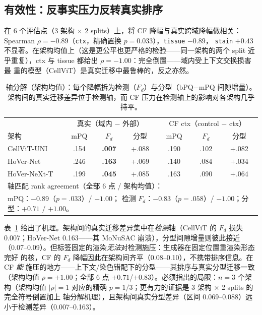 \documentclass[11pt]{article}
\begin{document}
\subsection{有效性：反事实压力反转真实排序}
\label{sec:validity}

在 6 个评估点（3 架构 $\times$ 2 splits）上，将 CF 降幅与真实跨域降幅做相关：Spearman
$\rho=-0.89$（\texttt{ctx}，精确置换 $p=0.033$），\texttt{tissue} $-0.89$，
\texttt{stain} $+0.43$ 不显著。在架构均值上（这是更公平也更严格的检验——同一架构的两个
split 近乎重复），ctx 与 tissue 都给出 $\rho=-1.00$：完全倒置——域内受上下文交换损害最
重的模型（CellViT）是真实迁移中最鲁棒的，反之亦然。

\begin{table}[t]
\centering\small
\caption{轴分解（架构均值）：每个降幅拆为检测（$F_d$）与分型（bPQ$-$mPQ 间隙增量）。
架构间的真实迁移差异位于检测轴，而 CF 压力在检测轴上的影响对各架构几乎持平。}
\label{tab:axes}
\begin{tabular}{lcc|cc|cc}
\toprule
& \multicolumn{3}{c|}{真实（域内 $-$ 外部）} & \multicolumn{3}{c}{CF ctx（control $-$ ctx）} \\
架构 & mPQ & $F_d$ & 分型 & mPQ & $F_d$ & 分型 \\
\midrule
CellViT-UNI  & .154 & \textbf{.007} & +.088 & .190 & .102 & +.082 \\
HoVer-Net    & .246 & \textbf{.163} & +.069 & .140 & .084 & +.034 \\
HoVer-NeXt-T & .199 & \textbf{.045} & +.085 & .163 & .090 & +.064 \\
\midrule
\multicolumn{7}{l}{\footnotesize 轴匹配 rank agreement（全部 6 点 / 架构均值）：}\\
\multicolumn{7}{l}{\footnotesize\quad mPQ：$-0.89$（$p{=}.033$）/ $-1.00$；\quad
检测 $F_d$：$-0.83$（$p{=}.058$）/ $-1.00$；\quad 分型：$+0.71$ / $\mathbf{+1.00}$。}\\
\bottomrule
\end{tabular}
\end{table}

表~\ref{tab:axes} 给出了机理。架构间的真实迁移差异集中在\emph{检测}轴（CellViT 的
$F_d$ 损失 0.007；HoVer-Net 0.163——其 MoNuSAC 崩溃），分型间隙增量则彼此接近
（0.07--0.09）。但标签固定的渲染\emph{无法}对检测施压：生成器在固定位置重渲染形态完好
的核，CF 的 $F_d$ 降幅因此在架构间齐平（0.08--0.10），不携带排序信息。在 CF \emph{能}
施压的地方——上下文/染色错配下的分型——其排序与真实分型迁移一致（架构均值
$\rho=+1.00$；全部 6 点 $+0.71$/$+0.83$）。必须指出的局限：$n=3$ 个架构（架构均值
$|\rho|=1$ 对应的精确 $p=1/3$；更有力的证据是 3 架构 $\times$ 2 splits 的完全符号倒置加上
轴分解机理），且架构间真实分型差异（区间 0.069--0.088）远小于检测差异（0.007--0.163）。
\end{document}
